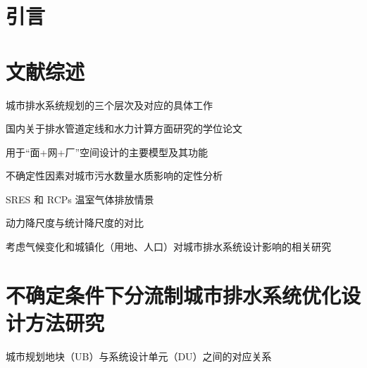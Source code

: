 \documentclass[degree=doctor]{thuthesis}
\begin{document}
\START


\frontmatter
\setcounter{page}{3}
\showoutput
\listoftables
\clearpage
\OMIT


\mainmatter
\chapter{引言}


\chapter{文献综述}

\clearpage
\setcounter{page}{13}
\begin{table}
  \centering
  \caption{城市排水系统规划的三个层次及对应的具体工作}
\end{table}

\clearpage
\setcounter{page}{25}
\begin{table}
  \centering
  \caption{国内关于排水管道定线和水力计算方面研究的学位论文}
\end{table}

\clearpage
\setcounter{page}{26}
\begin{table}
  \centering
  \caption{用于“面+网+厂”空间设计的主要模型及其功能}
\end{table}

\clearpage
\setcounter{page}{28}
\begin{table}
  \centering
  \caption{不确定性因素对城市污水数量水质影响的定性分析}
\end{table}

\clearpage
\setcounter{page}{35}
\begin{table}
  \centering
  \caption{SRES 和 RCPs 温室气体排放情景}
\end{table}

\clearpage
\setcounter{page}{36}
\begin{table}
  \centering
  \caption{动力降尺度与统计降尺度的对比}
\end{table}

\begin{table}
  \centering
  \caption{考虑气候变化和城镇化（用地、人口）对城市排水系统设计影响的相关研究}
\end{table}


\chapter{不确定条件下分流制城市排水系统优化设计方法研究}

\clearpage
\setcounter{page}{45}
\begin{table}
  \centering
  \caption{城市规划地块（UB）与系统设计单元（DU）之间的对应关系}
\end{table}
\end{document}
